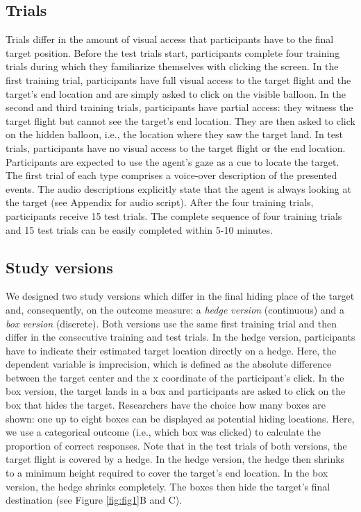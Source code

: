 \documentclass[
  man,floatsintext]{apa6}
\begin{document}
\hypertarget{trials}{%
\subsection{Trials}\label{trials}}

Trials differ in the amount of visual access that participants have to the final target position. Before the test trials start, participants complete four training trials during which they familiarize themselves with clicking the screen. In the first training trial, participants have full visual access to the target flight and the target's end location and are simply asked to click on the visible balloon. In the second and third training trials, participants have partial access: they witness the target flight but cannot see the target's end location. They are then asked to click on the hidden balloon, i.e., the location where they saw the target land. In test trials, participants have no visual access to the target flight or the end location. Participants are expected to use the agent's gaze as a cue to locate the target. The first trial of each type comprises a voice-over description of the presented events. The audio descriptions explicitly state that the agent is always looking at the target (see Appendix for audio script). After the four training trials, participants receive 15 test trials. The complete sequence of four training trials and 15 test trials can be easily completed within 5-10 minutes.

\hypertarget{study-versions}{%
\subsection{Study versions}\label{study-versions}}

We designed two study versions which differ in the final hiding place of the target and, consequently, on the outcome measure: a \emph{hedge version} (continuous) and a \emph{box version} (discrete). Both versions use the same first training trial and then differ in the consecutive training and test trials.
In the hedge version, participants have to indicate their estimated target location directly on a hedge. Here, the dependent variable is imprecision, which is defined as the absolute difference between the target center and the x coordinate of the participant's click.
In the box version, the target lands in a box and participants are asked to click on the box that hides the target. Researchers have the choice how many boxes are shown: one up to eight boxes can be displayed as potential hiding locations. Here, we use a categorical outcome (i.e., which box was clicked) to calculate the proportion of correct responses.
Note that in the test trials of both versions, the target flight is covered by a hedge. In the hedge version, the hedge then shrinks to a minimum height required to cover the target's end location. In the box version, the hedge shrinks completely. The boxes then hide the target's final destination (see Figure \ref{fig:fig1}B and C).
\end{document}
